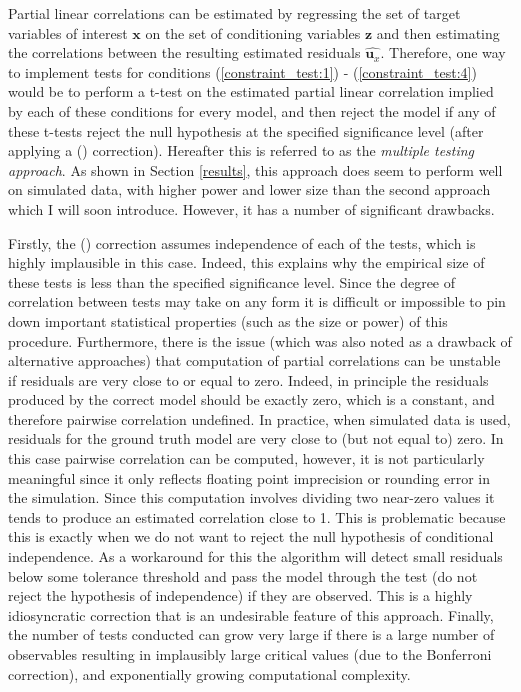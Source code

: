 \documentclass{article}
\begin{document}
Partial linear correlations can be estimated by regressing the set of target variables of interest $\mathbf{x}$ on the set of conditioning variables $\mathbf{z}$ and then estimating the correlations between the resulting estimated residuals $\hat{\mathbf{u}_x}$. Therefore, one way to implement tests for conditions (\ref{constraint_test:1}) - (\ref{constraint_test:4}) would be to perform a t-test on the estimated partial linear correlation implied by each of these conditions for every model, and then reject the model if any of these t-tests reject the null hypothesis at the specified significance level (after applying a \citeauthor{bonferroni1936teoria} (\citeyear{bonferroni1936teoria}) correction). Hereafter this is referred to as the \textit{multiple testing approach}. As shown in Section \ref{results}, this approach does seem to perform well on simulated data, with higher power and lower size than the second approach which I will soon introduce. However, it has a number of significant drawbacks. 

Firstly, the \citeauthor{bonferroni1936teoria} (\citeyear{bonferroni1936teoria}) correction assumes independence of each of the tests, which is highly implausible in this case. Indeed, this explains why the empirical size of these tests is less than the specified significance level. Since the degree of correlation between tests may take on any form it is difficult or impossible to pin down important statistical properties (such as the size or power) of this procedure. Furthermore, there is the issue (which was also noted as a drawback of alternative approaches) that computation of partial correlations can be unstable if residuals are very close to or equal to zero. Indeed, in principle the residuals produced by the correct model should be exactly zero, which is a constant, and therefore pairwise correlation undefined. In practice, when simulated data is used, residuals for the ground truth model are very close to (but not equal to) zero. In this case pairwise correlation can be computed, however, it is not particularly meaningful since it only reflects floating point imprecision or rounding error in the simulation. Since this computation involves dividing two near-zero values it tends to produce an estimated correlation close to 1. This is problematic because this is exactly when we do not want to reject the null hypothesis of conditional independence. As a workaround for this the algorithm will detect small residuals below some tolerance threshold and pass the model through the test (do not reject the hypothesis of independence) if they are observed. This is a highly idiosyncratic correction that is an undesirable feature of this approach. Finally, the number of tests conducted can grow very large if there is a large number of observables resulting in implausibly large critical values (due to the Bonferroni correction), and exponentially growing computational complexity.
\end{document}
